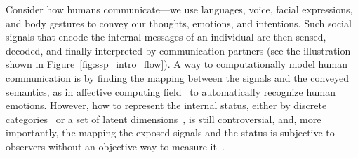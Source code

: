 

Consider how humans communicate---we use languages, voice, facial expressions, and body gestures to convey our thoughts, emotions, and intentions. Such social signals that encode the internal messages of an individual are then sensed, decoded, and finally interpreted by communication partners (see the illustration shown in Figure~\ref{fig:ssp_intro_flow}). A way to computationally model human communication is by finding the mapping between the signals and the conveyed semantics, as in affective computing field~\cite{picard1997affective, picard2003affective,poria2017review} to automatically recognize human emotions. However, how to represent the internal status, either by discrete categories~\cite{ekman1969} or a set of latent dimensions~\cite{osgood1952nature, russell1979affective, plutchik2001nature}, is still controversial, and, more importantly, the mapping the exposed signals and the status is subjective to observers without an objective way to measure it~\cite{steidl2005all}. 

